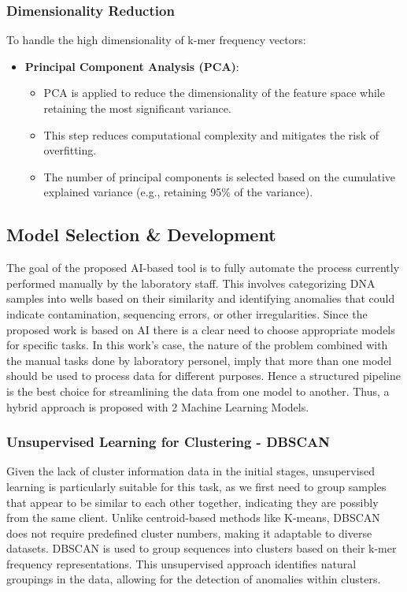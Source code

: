 \subsubsection{Dimensionality Reduction}
To handle the high dimensionality of k-mer frequency vectors:
\begin{itemize}
    \item \textbf{Principal Component Analysis (PCA)}:
    \begin{itemize}
        \item PCA is applied to reduce the dimensionality of the feature space while retaining the most significant variance.
        \item This step reduces computational complexity and mitigates the risk of overfitting.
        \item The number of principal components is selected based on the cumulative explained variance (e.g., retaining 95\% of the variance).
    \end{itemize}
\end{itemize}


\subsection{Model Selection \& Development}

The goal of the proposed AI-based tool is to fully automate the process currently performed manually by the laboratory staff. This involves categorizing DNA samples into wells based on their similarity and identifying anomalies that could indicate contamination, sequencing errors, or other irregularities. Since the proposed work is based on AI there is a clear need to choose appropriate models for specific tasks. 
In this work's case, the nature of the problem combined with the manual tasks done by laboratory personel, imply that more than one model should be used to process data for different purposes. Hence a structured pipeline is the best choice for streamlining the data from one model to another.
Thus, a hybrid approach is proposed with 2 Machine Learning Models.


\subsubsection{Unsupervised Learning for Clustering - DBSCAN}
Given the lack of cluster information data in the initial stages, unsupervised learning is particularly suitable for this task, as we first need to group samples that appear to be similar to each other together, indicating they are possibly from the same client. 
Unlike centroid-based methods like K-means, DBSCAN does not require predefined cluster numbers, making it adaptable to diverse datasets.
DBSCAN is used to group sequences into clusters based on their k-mer frequency representations. This unsupervised approach identifies natural groupings in the data, allowing for the detection of anomalies within clusters.

